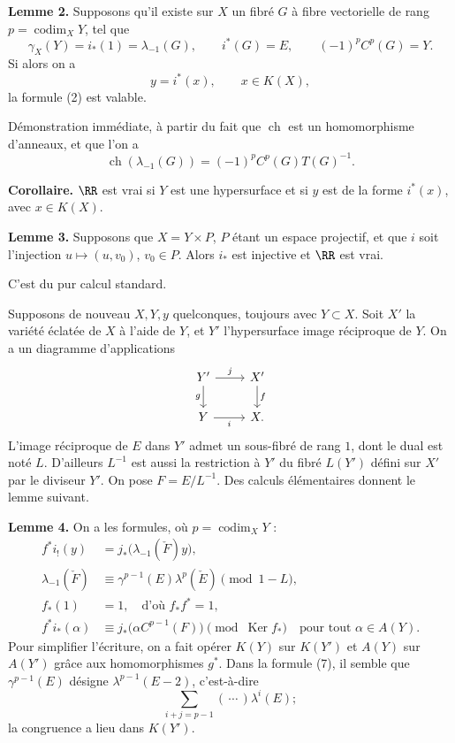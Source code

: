 \documentclass[11pt]{article}
\newcommand{\ch}{\operatorname{ch}}
\providecommand{\codim}{\operatorname{codim}}
\providecommand{\ch}{\operatorname{ch}}
\providecommand{\Ker}{\operatorname{Ker}}
\providecommand{\codim}{\operatorname{codim}}
\begin{document}
\textbf{Lemme 2.} Supposons qu'il existe sur \(X\) un fibré \(G\) à fibre vectorielle de rang \(p=\codim_XY\), tel que
\begin{equation}\tag{3}
  \gamma_X(Y)=i_*(1)=\lambda_{-1}(G),\qquad
  i^*(G)=E,\qquad
  (-1)^pC^p(G)=Y.
\end{equation}
Si alors on a
\begin{equation}\tag{4}
  y=i^*(x),\qquad x\in K(X),
\end{equation}
la formule (2) est valable.

Démonstration immédiate, à partir du fait que \(\ch\) est un homomorphisme d'anneaux, et que l'on a
\begin{equation}\tag{5}
  \ch(\lambda_{-1}(G))=(-1)^pC^p(G)T(G)^{-1}.
\end{equation}

\textbf{Corollaire.} \(\RR\) est vrai si \(Y\) est une hypersurface et si \(y\) est de la forme \(i^*(x)\), avec \(x\in K(X)\).

\textbf{Lemme 3.} Supposons que \(X=Y\times P\), \(P\) étant un espace projectif, et que \(i\) soit l'injection \(u\mapsto (u,v_0)\), \(v_0\in P\). Alors \(i_*\) est injective et \(\RR\) est vrai.

C'est du pur calcul standard.

Supposons de nouveau \(X,Y,y\) quelconques, toujours avec \(Y\subset X\). Soit \(X'\) la variété éclatée de \(X\) à l'aide de \(Y\), et \(Y'\) l'hypersurface image réciproque de \(Y\). On a un diagramme d'applications
\[
\begin{tikzcd}
Y' \arrow[r,"j"] \arrow[d,"g"'] & X' \arrow[d,"f"]\\
Y \arrow[r,"i"'] & X .
\end{tikzcd}
\]
L'image réciproque de \(E\) dans \(Y'\) admet un sous-fibré de rang \(1\), dont le dual est noté \(L\). D'ailleurs \(L^{-1}\) est aussi la restriction à \(Y'\) du fibré \(L(Y')\) défini sur \(X'\) par le diviseur \(Y'\). On pose \(F=E/L^{-1}\). Des calculs élémentaires donnent le lemme suivant.

\textbf{Lemme 4.} On a les formules, où \(p=\codim_XY\) :
\begin{align}
  f^*i_!(y)&=j_*\bigl(\lambda_{-1}(\check F)y\bigr), \tag{6}\\
  \lambda_{-1}(\check F)&\equiv \gamma^{p-1}(E)\lambda^p(\check E)
    \pmod{1-L}, \tag{7}\\
  f_*(1)&=1,\quad\text{d'où }f_*f^*=1, \tag{8}\\
  f^*i_*(\alpha)&\equiv j_*\bigl(\alpha C^{p-1}(F)\bigr)
    \pmod{\Ker f_*}\quad\text{pour tout }\alpha\in A(Y). \tag{9}
\end{align}
Pour simplifier l'écriture, on a fait opérer \(K(Y)\) sur \(K(Y')\) et \(A(Y)\) sur \(A(Y')\) grâce aux homomorphismes \(g^*\). Dans la formule (7), il semble que \(\gamma^{p-1}(E)\) désigne \(\lambda^{p-1}(E-2)\), c'est-à-dire
\[
  \sum_{i+j=p-1}(\,\cdots\,)\lambda^i(E);
\]
la congruence a lieu dans \(K(Y')\).
\end{document}

